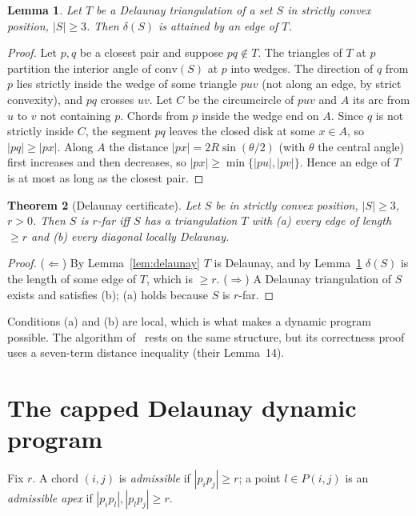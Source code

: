 \documentclass[11pt,a4paper]{article}
\newtheorem{theorem}{Theorem}
\newtheorem{lemma}[theorem]{Lemma}
\theoremstyle{definition}
\newcommand{\arc}[2]{P(#1,#2)}
\begin{document}
\begin{lemma}\label{lem:closest}
Let $T$ be a Delaunay triangulation of a set $S$ in strictly convex position,
$|S|\ge3$. Then $\delta(S)$ is attained by an edge of $T$.
\end{lemma}
\begin{proof}
Let $p,q$ be a closest pair and suppose $pq\notin T$. The triangles of $T$ at
$p$ partition the interior angle of $\mathrm{conv}(S)$ at $p$ into wedges. The
direction of $q$ from $p$ lies strictly inside the wedge of some triangle
$puv$ (not along an edge, by strict convexity), and $pq$ crosses $uv$. Let $C$
be the circumcircle of $puv$ and $A$ its arc from $u$ to $v$ not containing
$p$. Chords from $p$ inside the wedge end on $A$. Since $q$ is not strictly
inside $C$, the segment $pq$ leaves the closed disk at some $x\in A$, so
$|pq|\ge|px|$. Along $A$ the distance $|px|=2R\sin(\theta/2)$ (with $\theta$
the central angle) first increases and then decreases, so
$|px|\ge\min\{|pu|,|pv|\}$. Hence an edge of $T$ is at most as long as the
closest pair.
\end{proof}

\begin{theorem}[Delaunay certificate]\label{thm:cert}
Let $S$ be in strictly convex position, $|S|\ge3$, $r>0$. Then $S$ is $r$-far
iff $S$ has a triangulation $T$ with (a) every edge of length $\ge r$ and (b)
every diagonal locally Delaunay.
\end{theorem}
\begin{proof}
($\Leftarrow$) By Lemma~\ref{lem:delaunay} $T$ is Delaunay, and by
Lemma~\ref{lem:closest} $\delta(S)$ is the length of some edge of $T$, which
is $\ge r$. ($\Rightarrow$) A Delaunay triangulation of $S$ exists and
satisfies (b); (a) holds because $S$ is $r$-far.
\end{proof}

Conditions (a) and (b) are local, which is what makes a dynamic program
possible. The algorithm of~\cite{TW25} rests on the same structure, but its
correctness proof uses a seven-term distance inequality (their Lemma~14).

\section{The capped Delaunay dynamic program}\label{sec:dp}

Fix $r$. A chord $(i,j)$ is \emph{admissible} if $|p_ip_j|\ge r$; a point
$l\in\arc ij$ is an \emph{admissible apex} if $|p_ip_l|,|p_lp_j|\ge r$.
\end{document}

